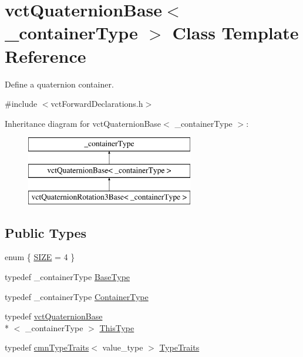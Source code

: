 \hypertarget{classvct_quaternion_base}{\section{vct\-Quaternion\-Base$<$ \-\_\-container\-Type $>$ Class Template Reference}
\label{classvct_quaternion_base}
}


Define a quaternion container.  




{\ttfamily \#include $<$vct\-Forward\-Declarations.\-h$>$}

Inheritance diagram for vct\-Quaternion\-Base$<$ \-\_\-container\-Type $>$\-:\begin{figure}[H]
\begin{center}
\leavevmode
\includegraphics[height=3.000000cm]{d2/dd4/classvct_quaternion_base}
\end{center}
\end{figure}
\subsection*{Public Types}
\begin{DoxyCompactItemize}
\item 
enum \{ \hyperlink{classvct_quaternion_base_a4cebcfc5f0fce9b5ead4e1e01fa8d868afd9c7f6b98e709b1a5c12c86e6a7ee8f}{S\-I\-Z\-E} = 4
 \}
\item 
typedef \-\_\-container\-Type \hyperlink{classvct_quaternion_base_a342c9d5a6e43b2e9e5325edcb5ebadbc}{Base\-Type}
\item 
typedef \-\_\-container\-Type \hyperlink{classvct_quaternion_base_ad9916f63417895bf3ac6ad6cd753cb47}{Container\-Type}
\item 
typedef \hyperlink{classvct_quaternion_base}{vct\-Quaternion\-Base}\\*
$<$ \-\_\-container\-Type $>$ \hyperlink{classvct_quaternion_base_af28efdc38acf89acb7a67afada11408c}{This\-Type}
\item 
typedef \hyperlink{classcmn_type_traits}{cmn\-Type\-Traits}$<$ value\-\_\-type $>$ \hyperlink{classvct_quaternion_base_a4c70fa57d856488a018b94b70d61b25c}{Type\-Traits}
\end{DoxyCompactItemize}
